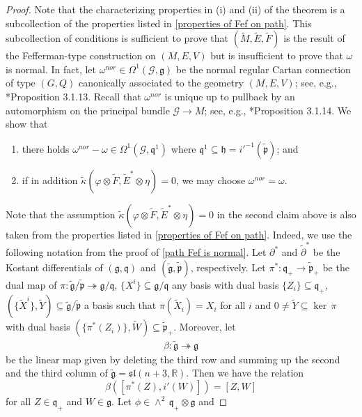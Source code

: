 \documentclass[11pt]{amsart}
\begin{document}
\begin{proof}
Note that the characterizing properties in (i) and (ii) of the theorem is a subcollection of the properties listed in \cref{properties of Fef on path}. This subcollection of conditions is sufficient to prove that $(\tilde M,\tilde E,\tilde F)$ is the result of the Fefferman-type construction on $(M,E,V)$ but is insufficient to prove that $\omega$ is normal. In fact, let $\omega^{nor}\in\Omega^1(\mathcal G,\mathfrak g)$
be the normal regular Cartan connection of type $(G,Q)$ canonically associated to the geometry $(M,E,V)$; see, e.g., \cite{Book}*{Proposition 3.1.13}. Recall that $\omega^{nor}$ is unique up to pullback by an automorphism on the principal bundle $\mathcal G\to M$; see, e.g., \cite{Book}*{Proposition 3.1.14}. We show that
\begin{enumerate}
    \item [$\bullet$] there holds $\omega^{nor}-\omega\in\Omega^1(\mathcal G,\mathfrak q^1)$ where $\mathfrak q^1\subseteq\mathfrak h=i'^{-1}(\tilde{\mathfrak p})$; and 
    \item [$\bullet$] if in addition $\tilde\kappa(\varphi\otimes\tilde F,\tilde E^*\otimes\eta)=0$, we may choose $\omega^{nor}=\omega$.
\end{enumerate}
Note that the assumption $\tilde\kappa(\varphi\otimes\tilde F,\tilde E^*\otimes\eta)=0$ in the second claim above is also taken from the properties listed in \cref{properties of Fef on path}. Indeed, we use the following notation from the proof of \cref{path Fef is normal}. Let $\partial^*$ and $\tilde{\partial}^*$ be the Kostant differentials of $(\mathfrak g,\mathfrak q)$ and $(\tilde{\mathfrak g},\tilde{\mathfrak p})$, respectively. Let $\pi^*:\mathfrak q_+\to\tilde{\mathfrak p}_+$ be the dual map of $\pi:\tilde{\mathfrak g}/\tilde{\mathfrak p}\twoheadrightarrow\mathfrak g/\mathfrak q$, $\{X^i\}\subseteq\mathfrak g/\mathfrak q$ any basis with dual basis $\{Z_i\}\subseteq\mathfrak q_+$, $(\{\tilde X^i\},\tilde Y)\subseteq\tilde{\mathfrak g}/\tilde{\mathfrak p}$ a basis such that $\pi(\tilde X_i)=X_i$ for all $i$ and $0\neq\tilde Y\subseteq\ker\,\pi$ with dual basis $(\{\pi^*(Z_i)\},\tilde W)\subseteq\tilde{\mathfrak p}_+$. Moreover, let 
\begin{align*}
\beta:\tilde{\mathfrak g}\twoheadrightarrow\mathfrak g
\end{align*}
be the linear map given by deleting the third row and summing up the second and the third column of $\tilde{\mathfrak g}=\mathfrak {sl}(n+3,\mathbb R)$. Then we have the relation
\[\beta([\pi^*(Z),i'(W)])=[Z,W]\]
for all $Z\in\mathfrak q_+$ and $W\in\mathfrak g$. Let $\phi\in\wedge^2\,\mathfrak q_+\otimes\mathfrak g$ and 

\end{proof}
\end{document}

